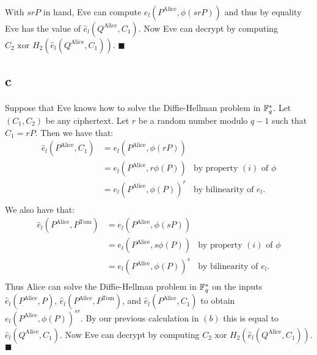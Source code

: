 \documentclass[letterpaper,12pt,oneside,onecolumn]{article}
\begin{document}
\paragraph{}
With $srP$ in hand, Eve can compute $e_l(P^\text{Alice},\phi(srP))$ and thus by equality Eve has the value of $\hat{e}_l (Q^\text{Alice}, C_1)$. Now Eve can decrypt by computing $C_2 \text{ xor } H_2(\hat{e}_l(Q^{\text{Alice}}, C_1))$. $\blacksquare$
\subsection*{c}
\paragraph{}
Suppose that Eve knows how to solve the Diffie-Hellman problem in $\mathbb{F}_q^*$. Let $(C_1, C_2)$ be any ciphertext. Let $r$ be a random number modulo $q-1$ such that $C_1 = rP$. Then we have that:
\begin{align*}
\hat{e}_l(P^\text{Alice}, C_1) &= e_l(P^\text{Alice}, \phi(rP)) \\
&= e_l(P^\text{Alice}, r\phi(P)) &\text{by property $(i)$ of $\phi$}\\
&= e_l(P^\text{Alice}, \phi(P))^r &\text{by bilinearity of $e_l$}. \\
\end{align*}
We also have that:
\begin{align*}
\hat{e}_l(P^\text{Alice}, P^\text{Tom}) &= e_l(P^\text{Alice}, \phi(sP)) \\
&= e_l(P^\text{Alice}, s\phi(P)) &\text{by property $(i)$ of $\phi$}\\
&= e_l(P^\text{Alice}, \phi(P))^s &\text{by bilinearity of $e_l$}. \\
\end{align*}
Thus Alice can solve the Diffie-Hellman problem in $\mathbb{F}_q^*$ on the inputs $\hat{e}_l(P^\text{Alice}, P)$, $\hat{e}_l(P^\text{Alice}, P^\text{Tom})$, and $\hat{e}_l(P^\text{Alice}, C_1)$ to obtain $e_l(P^\text{Alice}, \phi(P))^{sr}$. By our previous calculation in $(b)$ this is equal to $\hat{e}_l(Q^\text{Alice},C_1)$. Now Eve can decrypt by computing $C_2 \text{ xor } H_2(\hat{e}_l(Q^{\text{Alice}}, C_1))$. $\blacksquare$
\end{document}
